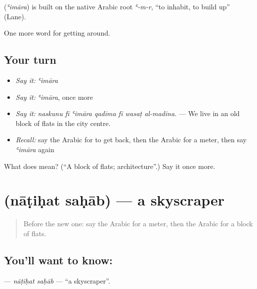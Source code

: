 \begin{cousinweb}
\textbf{} (\emph{ʿimāra}) is built on the native Arabic root \emph{ʿ-m-r}, \textquotedblleft{}to inhabit, to build up\textquotedblright{} (Lane).
\end{cousinweb}

\begin{grammarlens}[title={What you've built}]
One more word for getting around.
\end{grammarlens}

\subsection*{Your turn}
\begin{itemize}
\raggedright
  \item \emph{Say it:} \emph{ʿimāra}
  \item \emph{Say it:} \emph{ʿimāra}, once more
  \item \emph{Say it:} \emph{naskunu fī ʿimāra qadīma fī wasaṭ al-madīna.} — We live in an old block of flats in the city centre.
  \item \emph{Recall:} say the Arabic for to get back, then the Arabic for a meter, then say \emph{ʿimāra} again
\end{itemize}

\begin{tcolorbox}[breakable,colback=teal!4,colframe=teal!35!black,title={Before you move on}]
What does  mean? (\textquotedblleft{}A block of flats; architecture\textquotedblright{}.) Say it once more.
\end{tcolorbox}
\section[\texorpdfstring{\ar{ناطحة} \ar{سحاب} (nāṭiḥat saḥāb)}{ناطحة سحاب (nāṭiḥat saḥāb)}]{  (nāṭiḥat saḥāb) — a skyscraper}

\label{lesson:AR-C454-natihat-sahab}



\begin{quote}
Before the new one: say the Arabic for a meter, then the Arabic for a block of flats.
\end{quote}

\subsection*{You'll want to know:  }
\textbf{ } — \emph{nāṭiḥat saḥāb} — \textquotedblleft{}a skyscraper\textquotedblright{}.

